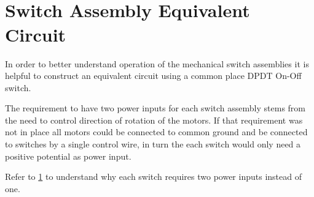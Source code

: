 \documentclass[12pt,letterpaper]{article}
\begin{document}
\nopagebreak 
\begin{figure}[h]
\centering
\def\svgwidth{0.5\columnwidth}

\end{figure}
\clearpage

\appendix
\section{\\Switch Assembly Equivalent Circuit} \label{appendixa}
In order to better understand operation of the mechanical switch assemblies it is helpful to construct an equivalent circuit using a common place DPDT On-Off switch.

The requirement to have two power inputs for each switch assembly stems from the need to control direction of rotation of the motors. If that requirement was not in place all motors could be connected to common ground and be connected to switches by a single control wire, in turn the each switch would only need a positive potential as power input.

Refer to \ref{appendixa} to understand why each switch requires two power inputs instead of one.
\end{document}
